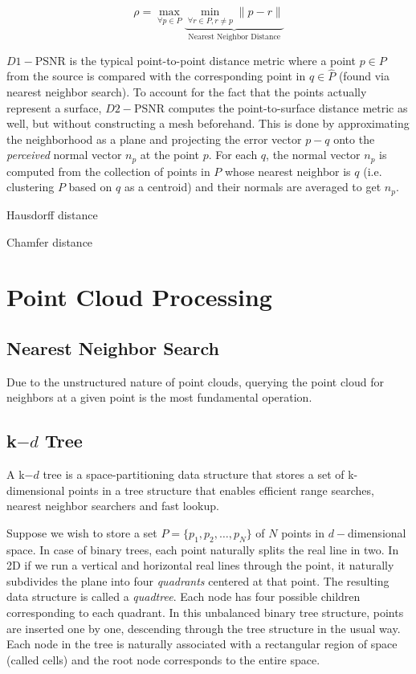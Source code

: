 $$
\rho = \max_{\forall p \in P} \underbrace{\min_{\forall r \in P, r \neq p} \|p - r\|}_{\text{Nearest Neighbor Distance}}
$$

$D1-$PSNR is the typical point-to-point distance metric where a point $p\in P$ from the source is compared with the corresponding point in $q \in \hat{P}$ (found via nearest neighbor search). To account for the fact that the points actually represent a surface, $D2-$PSNR computes the point-to-surface distance metric as well, but without constructing a mesh beforehand. This is done by approximating the neighborhood as a plane and projecting the error vector $p - q$ onto the \textit{perceived} normal vector $n_p$ at the point $p$. For each $q$, the normal vector $n_p$ is computed from the collection of points in $P$ whose nearest neighbor is $q$ (i.e. clustering $P$ based on $q$ as a centroid) and their normals are averaged to get $n_p$.

Hausdorff distance

Chamfer distance

\section{Point Cloud Processing}


\subsection{Nearest Neighbor Search}
Due to the unstructured nature of point clouds, querying the point cloud for neighbors at a given point is the most fundamental operation.



\subsection{k$-d$ Tree}
A k$-d$ tree is a space-partitioning data structure that stores a set of k-dimensional points in a tree structure that enables efficient range searches, nearest neighbor searchers and fast lookup.

Suppose we wish to store a set $P = \{p_1, p_2, \ldots, p_N\}$ of $N$ points in $d-$dimensional space. In case of binary trees, each point naturally splits the real line in two. In 2D if we run a vertical and horizontal real lines through the point, it naturally subdivides the plane into four \textit{quadrants} centered at that point. The resulting data structure is called a \textit{quadtree}. Each node has four possible children corresponding to each quadrant. In this unbalanced binary tree structure, points are inserted one by one, descending through the tree structure in the usual way. Each node in the tree is naturally associated with a rectangular region of space (called cells) and the root node corresponds to the entire space.

